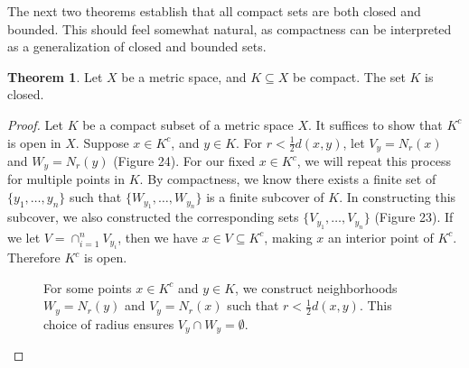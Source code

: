 \documentclass{article}
\theoremstyle{definition}
\newtheorem{theorem}{Theorem}[section]
\begin{document}
	The next two theorems establish that all compact sets are both closed and bounded. This should feel somewhat natural, as compactness can be interpreted as a generalization of closed and bounded sets.
	\begin{theorem}
		Let $ X $ be a metric space, and $ K\subseteq X $ be compact. The set $ K $ is closed. 
	\end{theorem} 
	\begin{proof}
		Let $ K $ be a compact subset of a metric space $ X $. It suffices to show that $ K^c $ is open in $ X $. Suppose $ x\in K^c $, and $ y\in K $. For $ r<\frac{1}{2}d(x,y) $, let $ V_y=N_r(x) $ and $ W_y=N_r(y) $ (Figure 24). For our fixed $ x\in K^c $, we will repeat this process for multiple points in $ K $. By compactness, we know there exists a finite set of $ \{y_1,\ldots,y_n\} $ such that $ \{W_{y_1},\ldots,W_{y_n}\} $ is a finite subcover of $ K $. In constructing this subcover, we also constructed the corresponding sets $ \{V_{y_1},\ldots, V_{y_n}\} $ (Figure 23). If we let $ V=\cap_{i=1}^n V_{y_i} $, then we have $ x\in V\subseteq K^c $, making $ x $ an interior point of $ K^c $. Therefore $ K^c $ is open.
		\begin{figure}[h!]
			\centering
			\caption{For some points $ x\in K^c $ and $ y\in K $, we construct neighborhoods $ W_y=N_r(y)$ and $ V_y=N_r(x) $ such that $ r<\frac{1}{2}d(x,y) $. This choice of radius ensures $ V_y\cap W_y=\emptyset $.}  
		\end{figure}
		\begin{figure}[h!]
			\centering
\end{figure}
\end{proof}
\end{document}
